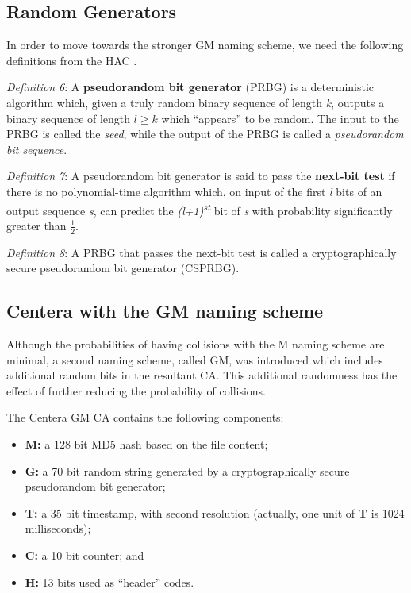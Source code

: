 \subsection{Random Generators}\label{sec:5.3}\label{random-generators}

In order to move towards the stronger GM naming scheme, we need the
following definitions from the HAC \cite{ref2}.

\emph{Definition 6}: A \textbf{pseudorandom bit generator} (PRBG) is a
deterministic algorithm which, given a truly random binary sequence of
length \emph{k}, outputs a binary sequence of length \(l\ge k\) which
``appears'' to be random. The input to the PRBG is called the
\emph{seed}, while the output of the PRBG is called a \emph{pseudorandom
bit sequence}.

\emph{Definition 7}: A pseudorandom bit generator is said to pass the
\textbf{next-bit test} if there is no polynomial-time algorithm which,
on input of the first \emph{l} bits of an output sequence \emph{s}, can
predict the \emph{(l+1)}\textsuperscript{\emph{st}} bit of \emph{s} with
probability significantly greater than \(\frac12\).

\emph{Definition 8}: A PRBG that passes the next-bit test is called a
cryptographically secure pseudorandom bit generator (CSPRBG).

\subsection{Centera with the GM naming
scheme}\label{sec:5.4}\label{centera-with-the-gm-naming-scheme}

Although the probabilities of having collisions with the M naming scheme
are minimal, a second naming scheme, called GM, was introduced which
includes additional random bits in the resultant CA. This additional
randomness has the effect of further reducing the probability of
collisions.

The Centera GM CA contains the following components:

\begin{itemize}
\tightlist
\item
  \textbf{M:} a 128 bit MD5 hash based on the file content;
\item
  \textbf{G:} a 70 bit random string generated by a cryptographically
  secure pseudorandom bit generator;
\item
  \textbf{T:} a 35 bit timestamp, with second resolution (actually, one
  unit of \textbf{T} is 1024 milliseconds);
\item
  \textbf{C:} a 10 bit counter; and
\item
  \textbf{H:} 13 bits used as ``header'' codes.
\end{itemize}

